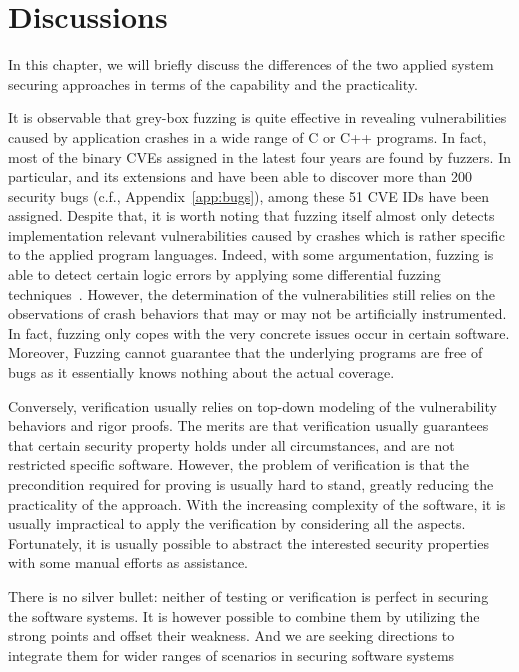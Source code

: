 
\chapter{Discussions} \label{ch:discuss}
In this chapter, we will briefly discuss the differences of the two applied system securing approaches in terms of the capability and the practicality.

It is observable that grey-box fuzzing is quite effective in revealing vulnerabilities caused by application crashes in a wide range of C or C++ programs. In fact, most of the binary CVEs assigned in the latest four years are found by fuzzers. In particular, \FOT and its extensions \dFOT and \mtfuzz have been able to discover more than 200 security bugs (c.f., Appendix~\ref{app:bugs}), among these 51 CVE IDs have been assigned. Despite that, it is worth noting that fuzzing itself almost only detects implementation relevant vulnerabilities caused by crashes which is rather specific to the applied program languages. Indeed, with some argumentation, fuzzing is able to detect certain logic errors by applying some differential fuzzing techniques~\cite{nezha}. However, the determination of the vulnerabilities still relies on the observations of crash behaviors that may or may not be artificially instrumented. In fact, fuzzing only copes with the very concrete issues occur in certain software. Moreover, Fuzzing cannot guarantee that the underlying programs are free of bugs as it essentially knows nothing about the actual coverage.

Conversely, verification usually relies on top-down modeling of the vulnerability behaviors and rigor proofs. The merits are that verification usually guarantees that certain security property holds under all circumstances, and are not restricted specific software. However, the problem of verification is that the precondition required for proving is usually hard to stand, greatly reducing the practicality of the approach. With the increasing complexity of the software, it is usually impractical to apply the verification by considering all the aspects. Fortunately, it is usually possible to abstract the interested security properties with some manual efforts as assistance.

There is no silver bullet: neither of testing or verification is perfect in securing the software systems. It is however possible to combine them by utilizing the strong points and offset their weakness. And we are seeking directions to integrate them for wider ranges of scenarios in securing software systems